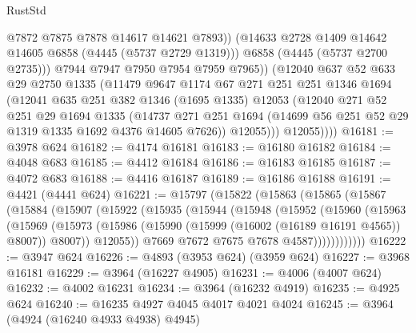\begin{lexlean}{RustStd}
\begin{coremodule}
{\begin{coremodule}
{{{{{{{{{{{{{{{{{{{{{{{{{{{{{{{{{{{{{{                    @7872
                    @7875
                    @7878
                    @14617
                    @14621
                    @7893))
                (@14633 @2728 @1409 @14642 @14605 @6858 (@4445 (@5737 @2729 @1319)))
                @6858
                (@4445 (@5737 @2700 @2735)))
              @7944
              @7947
              @7950
              @7954
              @7959
              @7965))
          (@12040
            @637
            @52
            @633
            @29
            @2750
            @1335
            (@11479
              @9647
              @1174
              @67
              @271
              @251
              @251
              @1346
              @1694
              (@12041
                @635
                @251
                @382
                @1346
                (@1695 @1335)
                @12053
                (@12040
                  @271
                  @52
                  @251
                  @29
                  @1694
                  @1335
                  (@14737
                    @271
                    @251
                    @1694
                    (@14699 @56 @251 @52 @29 @1319 @1335 @1692 @4376 @14605 @7626))
                  @12055)))
            @12055))))
@16181 := @3978 @624
@16182 := @4174 @16181
@16183 := @16180 @16182
@16184 := @4048 @683
@16185 := @4412 @16184
@16186 := @16183 @16185
@16187 := @4072 @683
@16188 := @4416 @16187
@16189 := @16186 @16188
@16191 := @4421 (@4441 @624)
@16221 := @15797
    (@15822
      (@15863
        (@15865
          (@15867
            (@15884
              (@15907
                (@15922
                  (@15935
                    (@15944
                      (@15948
                        (@15952
                          (@15960
                            (@15963
                              (@15969
                                (@15973
                                  (@15986
                                    (@15990 (@15999 (@16002 (@16189 @16191 @4565)) @8007))
                                    @8007))
                                @12055))
                            @7669
                            @7672
                            @7675
                            @7678
                            @4587))))))))))))
@16222 := @3947 @624
@16226 := @4893 (@3953 @624) (@3959 @624)
@16227 := @3968 @16181
@16229 := @3964 (@16227 @4905)
@16231 := @4006 (@4007 @624)
@16232 := @4002 @16231
@16234 := @3964 (@16232 @4919)
@16235 := @4925 @624
@16240 := @16235 @4927 @4045 @4017 @4021 @4024
@16245 := @3964 (@4924 (@16240 @4933 @4938) @4945)
}}}}}}}}}}}}}}}}}}}}}}}}}}}}}}}}}}}}}}
\end{coremodule}}
\end{coremodule}
\end{lexlean}
